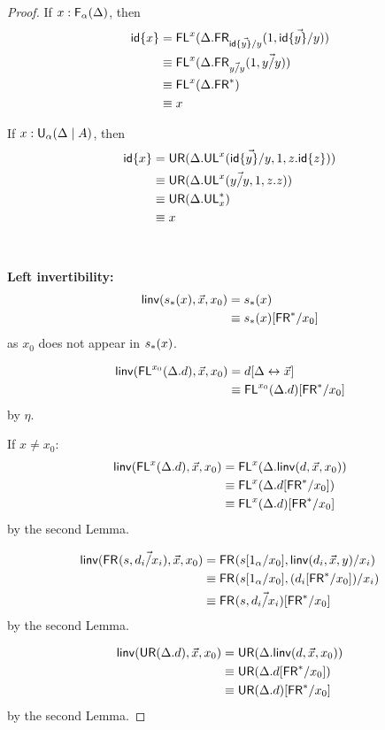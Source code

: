 \begin{proof}
If $x : \mathsf{F}_{\alpha}(\Delta)$, then
\begin{align*}
{\ensuremath{\mathsf{id}}\{x\}} 
&=\mathsf{FL}^{x}(\Delta.\mathsf{FR}_{\vec{{\mathsf{id}\{y\}}/y}}(1,\vec{{\mathsf{id}\{y\}}/y}))\\
&\equiv \mathsf{FL}^{x}(\Delta.\mathsf{FR}_{\vec{y/y}}(1,\vec{y/y}))\\
&\equiv \mathsf{FL}^{x}(\Delta.\mathsf{FR}^*)\\
&\equiv x
\end{align*}

If $x : \mathsf{U}_{\alpha}(\Delta \mid A)$, then
\begin{align*}
{\ensuremath{\mathsf{id}}\{x\}} 
&= \mathsf{UR}(\Delta.\mathsf{UL}^{x}_{}(\vec{{\mathsf{id}\{y\}}/y},1,z.{\mathsf{id}\{z\}}))\\
&\equiv \mathsf{UR}(\Delta.\mathsf{UL}^{x}_{}(\vec{y/y},1,z.z))\\
&\equiv \mathsf{UR}(\Delta.\mathsf{UL}^*_{x})\\
&\equiv x
\end{align*}
\\~\\
\textbf{Left invertibility:}
\begin{align*}
\mathsf{linv}(s_*(x),\vec{x},x_0) 
&= {s_*(x)} \\
&\equiv s_*(x)[\mathsf{FR}^*/x_0]
\end{align*}
as $x_0$ does not appear in $s_*(x)$.

\begin{align*}
\mathsf{linv}(\mathsf{FL}^{x_0}(\Delta.d),\vec{x},x_0) 
&= d[\Delta \leftrightarrow \vec{x}]\\
&\equiv \mathsf{FL}^{x_0}(\Delta.d)[\mathsf{FR}^*/x_0]
\end{align*}
by $\eta$.

If $x \neq x_0$: 
\begin{align*}
\mathsf{linv}(\mathsf{FL}^{x}(\Delta.d),\vec{x},x_0) 
&= \mathsf{FL}^{x}(\Delta.\mathsf{linv}(d,\vec{x},x_0)) \\
&\equiv \mathsf{FL}^{x}(\Delta.d[\mathsf{FR}^*/x_0]) \\
&\equiv \mathsf{FL}^{x}(\Delta.d)[\mathsf{FR}^*/x_0]
\end{align*}
by the second Lemma.

\begin{align*}
\mathsf{linv}(\mathsf{FR}_{}(s,\vec{d_i/x_i}),\vec{x},x_0) 
&= \mathsf{FR}_{}(s[1_\alpha/x_0],{{\mathsf{linv}(d_i,\vec{x},y)}/x_i}) \\
&\equiv \mathsf{FR}_{}(s[1_\alpha/x_0],(d_i[\mathsf{FR}^*/x_0])/x_i) \\
&\equiv \mathsf{FR}_{}(s,\vec{d_i/x_i})[\mathsf{FR}^*/x_0]
\end{align*}
by the second Lemma.

\begin{align*}
\mathsf{linv}(\mathsf{UR}(\Delta.d),\vec{x},x_0) 
&= \mathsf{UR}(\Delta.\mathsf{linv}(d,\vec{x},x_0)) \\
&\equiv \mathsf{UR}(\Delta.d[\mathsf{FR}^*/x_0]) \\
&\equiv \mathsf{UR}(\Delta.d)[\mathsf{FR}^*/x_0]
\end{align*}
by the second Lemma.


\end{proof}
